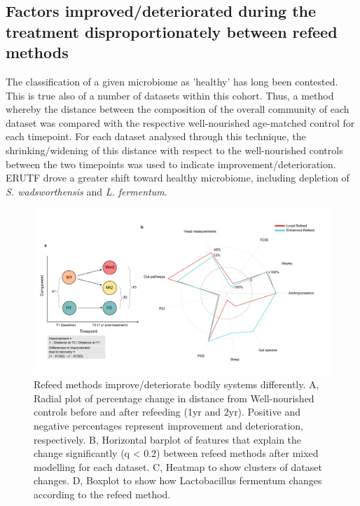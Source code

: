 \documentclass{article}
\begin{document}
\subsection*{Factors improved/deteriorated during the treatment disproportionately between refeed methods}
The classification of a given microbiome as 'healthy' has long been contested.
This is true also of a number of datasets within this cohort.
Thus, a method whereby the distance between the composition of the overall community of each dataset was compared with the respective well-nourished age-matched control for each timepoint.
For each dataset analysed through this technique, the shrinking/widening of this distance with respect to the well-nourished controls between the two timepoints was used to indicate improvement/deterioration.
ERUTF drove a greater shift toward healthy microbiome, including depletion of \textit{S. wadsworthensis} and \textit{L. fermentum}.

\begin{figure}[H]
	\centering
	\includegraphics[scale=0.6]{figures/newrecoveryfeed4}
	\caption[Refeed methods improve/deteriorate bodily systems differently]{
		Refeed methods improve/deteriorate bodily systems differently.
		A, Radial plot of percentage change in distance from Well-nourished controls before and after refeeding (1yr and 2yr). Positive and negative percentages represent improvement and deterioration, respectively.
		B, Horizontal barplot of features that explain the change significantly (q \textless{} 0.2) between refeed methods after mixed modelling for each dataset.
		C, Heatmap to show clusters of dataset changes.
		D, Boxplot to show how Lactobacillus fermentum changes according to the refeed method.
	}
\label{fig:Figure3}
\end{figure}
\end{document}
